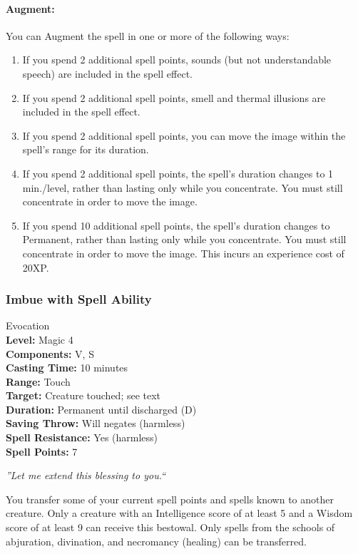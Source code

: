 \paragraph{Augment:} You can Augment the spell in one or more of the following ways:
\begin{enumerate}
 \item If you spend 2 additional spell points, sounds (but not understandable speech) are included in the spell effect.
 \item If you spend 2 additional spell points, smell and thermal illusions are included in the spell effect.
 \item If you spend 2 additional spell points, you can move the image within the spell's range for its duration.
 \item If you spend 2 additional spell points, the spell's duration changes to 1 min./level, rather than lasting only while you concentrate.
 You must still concentrate in order to move the image.
 \item If you spend 10 additional spell points, the spell's duration changes to Permanent, rather than lasting only while you concentrate.
 You must still concentrate in order to move the image. This incurs an experience cost of 20XP.
\end{enumerate}
\subsubsection{Imbue with Spell Ability}
\label{Spell:ImbueWithSpellAbility}
Evocation
\\ \textbf{Level:} Magic 4
\\ \textbf{Components:} V, S
\\ \textbf{Casting Time:} 10 minutes
\\ \textbf{Range:} Touch
\\ \textbf{Target:} Creature touched; see text
\\ \textbf{Duration:} Permanent until discharged (D)
\\ \textbf{Saving Throw:} Will negates (harmless)
\\ \textbf{Spell Resistance:} Yes (harmless)
\\ \textbf{Spell Points:} 7

\emph{''Let me extend this blessing to you.``}

You transfer some of your current spell points and spells known to another creature. 
Only a creature with an Intelligence score of at least 5 and a Wisdom score of at least 9 can receive this bestowal. 
Only spells from the schools of abjuration, divination, and necromancy (healing) can be transferred. 

